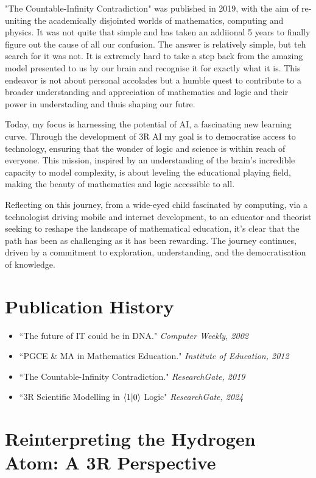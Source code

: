 \documentclass[12pt]{article}
\begin{document}
"The Countable-Infinity Contradiction"\rCIC{} was published in 2019, with the aim of re-uniting the academically disjointed worlds of mathematics, computing and physics. It was not quite that simple and has taken an addiional 5 years to finally figure out the cause of all our confusion. The answer is relatively simple, but teh search for it was not. It is extremely hard to take a step back from the amazing model presented to us by our brain and recognise it for exactly what it is. This endeavor is not about personal accolades but a humble quest to contribute to a broader understanding and appreciation of mathematics and logic and their power in understading and thuis shaping our futre.

Today, my focus is harnessing the potential of AI, a fascinating new learning curve. Through the development of 3R AI my goal is to democratise access to technology, ensuring that the wonder of logic and science is within reach of everyone. This mission, inspired by an understanding of the brain's incredible capacity to model complexity, is about leveling the educational playing field, making the beauty of mathematics and logic accessible to all.

Reflecting on this journey, from a wide-eyed child fascinated by computing, via a technologist driving mobile and internet development, to an educator and theorist seeking to reshape the landscape of mathematical education, it's clear that the path has been as challenging as it has been rewarding. The journey continues, driven by a commitment to exploration, understanding, and the democratisation of knowledge.

\section*{Publication History}
\begin{itemize}
    \item \rDNA{} ``The future of IT could be in DNA." \textit{Computer Weekly, 2002}
    \item \rIoE{} ``PGCE \& MA in Mathematics Education." \textit{Institute of Education, 2012}
    \item \rCIC{} ``The Countable-Infinity Contradiction." \textit{ResearchGate, 2019}
    \item \rR{} ``3R Scientific Modelling in \(\langle 1 | 0 \rangle\) Logic" \textit{ResearchGate, 2024}
\end{itemize}


\section{Reinterpreting the Hydrogen Atom: A 3R Perspective}
\end{document}
